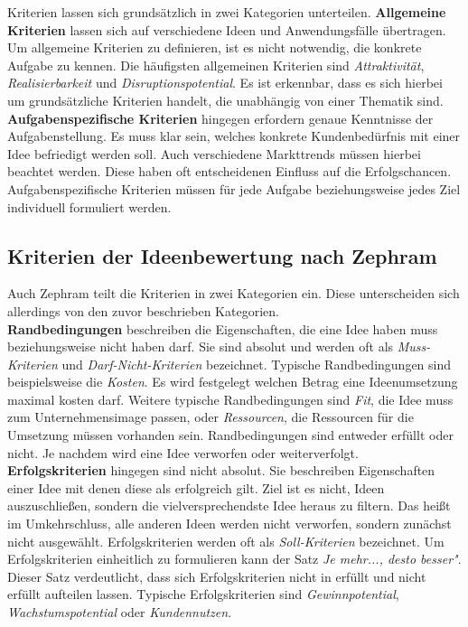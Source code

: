 Kriterien lassen sich grundsätzlich in zwei Kategorien unterteilen.
\textbf{Allgemeine Kriterien} lassen sich auf verschiedene Ideen und Anwendungsfälle übertragen.
Um allgemeine Kriterien zu definieren, ist es nicht notwendig, die konkrete Aufgabe zu kennen. 
Die häufigsten allgemeinen Kriterien sind \textit{Attraktivität}, \textit{Realisierbarkeit} und 
\textit{Disruptionspotential}. Es ist erkennbar, dass es sich hierbei um grundsätzliche Kriterien handelt, die unabhängig von einer Thematik sind.\\
\textbf{Aufgabenspezifische Kriterien} hingegen erfordern genaue Kenntnisse der Aufgabenstellung. Es muss klar sein, welches 
konkrete Kundenbedürfnis mit einer Idee befriedigt werden soll. Auch verschiedene Markttrends müssen hierbei beachtet werden. 
Diese haben oft entscheidenen Einfluss auf die Erfolgschancen. Aufgabenspezifische Kriterien müssen für jede Aufgabe beziehungsweise jedes Ziel 
individuell formuliert werden.

\subsection{Kriterien der Ideenbewertung nach Zephram}
Auch Zephram teilt die Kriterien in zwei Kategorien ein. Diese unterscheiden sich allerdings von den zuvor beschrieben Kategorien.\\
\textbf{Randbedingungen} beschreiben die Eigenschaften, die eine Idee haben muss
beziehungsweise nicht haben darf. Sie sind absolut und werden oft als \textit{Muss-Kriterien}
und \textit{Darf-Nicht-Kriterien} bezeichnet.
Typische Randbedingungen sind beispielsweise die \textit{Kosten}. 
Es wird festgelegt welchen Betrag eine Ideenumsetzung maximal kosten darf. 
Weitere typische Randbedingungen sind \textit{Fit}, die Idee muss zum Unternehmensimage passen, oder \textit{Ressourcen}, die Ressourcen für die
Umsetzung müssen vorhanden sein. 
Randbedingungen sind entweder erfüllt oder nicht. Je nachdem wird eine Idee verworfen oder weiterverfolgt. \\

\textbf{Erfolgskriterien} hingegen sind nicht absolut. Sie beschreiben Eigenschaften einer Idee 
mit denen diese als erfolgreich gilt. Ziel ist es nicht, Ideen auszuschließen, sondern die
vielversprechendste Idee heraus zu filtern. Das heißt im Umkehrschluss, alle anderen Ideen werden nicht 
verworfen, sondern zunächst nicht ausgewählt. Erfolgskriterien werden oft als \textit{Soll-Kriterien} bezeichnet. Um 
Erfolgskriterien einheitlich zu formulieren kann der Satz \textit{Je mehr..., desto besser"}.
Dieser Satz verdeutlicht, dass sich Erfolgskriterien nicht in erfüllt und nicht erfüllt aufteilen 
lassen. Typische Erfolgskriterien sind \textit{Gewinnpotential}, \textit{Wachstumspotential} oder \textit{Kundennutzen}.\\

